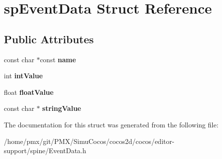 \hypertarget{structspEventData}{}\section{sp\+Event\+Data Struct Reference}
\label{structspEventData}
\subsection*{Public Attributes}
\begin{DoxyCompactItemize}
\item 
\mbox{\label{structspEventData_a19f484844b9d326b14eb805f80572ffe}} 
const char $\ast$const {\bfseries name}
\item 
\mbox{\label{structspEventData_ad370770c1cd1150e9715b32be92cc5bd}} 
int {\bfseries int\+Value}
\item 
\mbox{\label{structspEventData_aa47fa9ecfb12a261b00d6266ef00fe9c}} 
float {\bfseries float\+Value}
\item 
\mbox{\label{structspEventData_a64dbd277a63218c53a72f71b799901dd}} 
const char $\ast$ {\bfseries string\+Value}
\end{DoxyCompactItemize}


The documentation for this struct was generated from the following file\+:\begin{DoxyCompactItemize}
\item 
/home/pmx/git/\+P\+M\+X/\+Simu\+Cocos/cocos2d/cocos/editor-\/support/spine/Event\+Data.\+h\end{DoxyCompactItemize}
